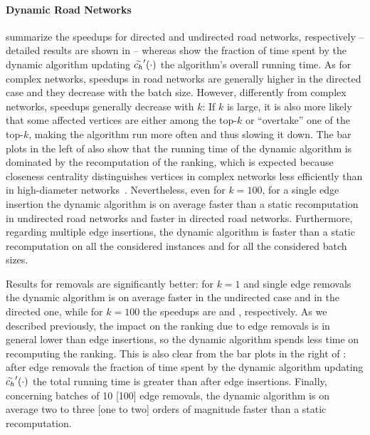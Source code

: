 \paragraph{Dynamic Road Networks}
%
 summarize
the speedups for directed and undirected road networks, respectively --
detailed results are shown in
 --
whereas
 show
the fraction of time spent by the dynamic algorithm updating $\widetilde{c_h}'(\cdot)$ \wrt
the algorithm's overall running time.
%
As for complex networks, speedups in road networks are generally higher in
the directed case and they decrease with the batch size. However, differently
from complex networks, speedups generally decrease with $k$: If $k$ is large,
it is also more likely that some affected vertices are either among the top-$k$
or \enquote{overtake} one of the top-$k$, making the algorithm run \bfsbound more
often and thus slowing it down. The bar plots in the left of
also show that the running time of the dynamic algorithm is dominated by the
recomputation of the ranking, which is expected because closeness centrality
distinguishes vertices in complex networks less efficiently than in high-diameter
networks~\cite[Ch. 7]{newman2018networks}.
Nevertheless, even for $k = 100$, for a single edge insertion
the dynamic algorithm is on average \speedupStreetUndInsertKHundredBOne faster than
a static recomputation in undirected road networks
and \speedupStreetDirInsertKHundredBOne faster in directed road networks.
Furthermore, regarding multiple edge insertions, the dynamic
algorithm is faster than a static recomputation on all the considered instances and
for all the considered batch sizes.

Results for removals are significantly better: for $k = 1$ and single edge removals
the dynamic algorithm is on average
\speedupStreetUndRemovalKOneBOne faster in the undirected case and
\speedupStreetDirRemovalKOneBOne in the directed one, while
for $k = 100$ the speedups are \speedupStreetUndRemovalKHundredBOne
and \speedupStreetDirRemovalKHundredBOne, respectively.
%
As we described previously, the impact on the ranking due to edge
removals is in general lower than edge insertions, so the dynamic algorithm
spends less time on recomputing the ranking. This is also clear from the bar
plots in the right of
:
after edge removals the fraction of time spent by the dynamic algorithm
updating $\widetilde{c_h}'(\cdot)$ \wrt the total running time is greater than after edge
insertions.
%
Finally, concerning batches of 10 [100] edge removals, the dynamic algorithm is
on average two to three [one to two] orders of magnitude faster than a static
recomputation.

